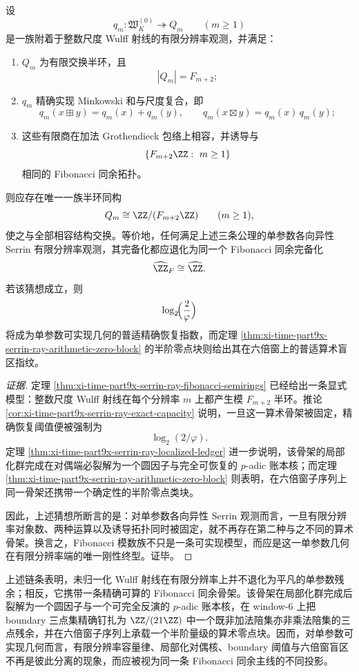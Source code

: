 \begin{conjecture}\label{conj:xi-time-part9x-serrin-ray-fibonacci-universality}
设
\[
q_m:\mathfrak W_K^{(0)}\twoheadrightarrow Q_m
\qquad(m\ge 1)
\]
是一族附着于整数尺度 Wulff 射线的有限分辨率观测，并满足：
\begin{enumerate}
  \item \(Q_m\) 为有限交换半环，且
  \[
  |Q_m|=F_{m+2};
  \]
  \item \(q_m\) 精确实现 Minkowski 和与尺度复合，即
  \[
  q_m(x\boxplus y)=q_m(x)+q_m(y),
  \qquad
  q_m(x\boxtimes y)=q_m(x)\,q_m(y);
  \]
  \item 这些有限商在加法 Grothendieck 包络上相容，并诱导与
  \[
  \{F_{m+2}\ZZ:\ m\ge 1\}
  \]
  相同的 Fibonacci 同余拓扑。
\end{enumerate}
则应存在唯一一族半环同构
\[
Q_m\cong \ZZ/(F_{m+2}\ZZ)
\qquad(m\ge 1),
\]
使之与全部相容结构交换。等价地，任何满足上述三条公理的单参数各向异性 Serrin 有限分辨率观测，其完备化都应退化为同一个 Fibonacci 同余完备化
\[
\widehat{\ZZ}_F\cong \widehat{\ZZ}.
\]
若该猜想成立，则
\[
\log_2\!\Bigl(\frac{2}{\varphi}\Bigr)
\]
将成为单参数可实现几何的普适精确恢复指数，而定理
\ref{thm:xi-time-part9x-serrin-ray-arithmetic-zero-block} 的半阶零点块则给出其在六倍窗上的普适算术盲区指纹。
\end{conjecture}
\begin{proof}[证据]
定理 \ref{thm:xi-time-part9x-serrin-ray-fibonacci-semirings} 已经给出一条显式模型：整数尺度 Wulff 射线在每个分辨率 \(m\) 上都产生模 \(F_{m+2}\) 半环。推论 \ref{cor:xi-time-part9x-serrin-ray-exact-capacity} 说明，一旦这一算术骨架被固定，精确恢复阈值便被强制为
\[
\log_2(2/\varphi).
\]
定理 \ref{thm:xi-time-part9x-serrin-ray-localized-ledger} 进一步说明，该骨架的局部化群完成在对偶端必裂解为一个圆因子与完全可恢复的 \(p\)-adic 账本核；而定理 \ref{thm:xi-time-part9x-serrin-ray-arithmetic-zero-block} 则表明，在六倍窗子序列上同一骨架还携带一个确定性的半阶零点类块。

因此，上述猜想所断言的是：对单参数各向异性 Serrin 观测而言，一旦有限分辨率对象数、两种运算以及诱导拓扑同时被固定，就不再存在第二种与之不同的算术骨架。换言之，Fibonacci 模数族不只是一条可实现模型，而应是这一单参数几何在有限分辨率端的唯一刚性终型。证毕。
\end{proof}

\noindent
上述链条表明，未归一化 Wulff 射线在有限分辨率上并不退化为平凡的单参数残余；相反，它携带一条精确可算的 Fibonacci 同余骨架。该骨架在局部化群完成后裂解为一个圆因子与一个可完全反演的 \(p\)-adic 账本核，在 window-\(6\) 上把 boundary 三点集精确钉扎为 \(\ZZ/(21\ZZ)\) 中一个既非加法陪集亦非乘法陪集的三点残余，并在六倍窗子序列上承载一个半阶量级的算术零点块。因而，对单参数可实现几何而言，有限分辨率容量律、局部化对偶核、boundary 阈值与六倍窗盲区不再是彼此分离的现象，而应被视为同一条 Fibonacci 同余主线的不同投影。

\endinput
